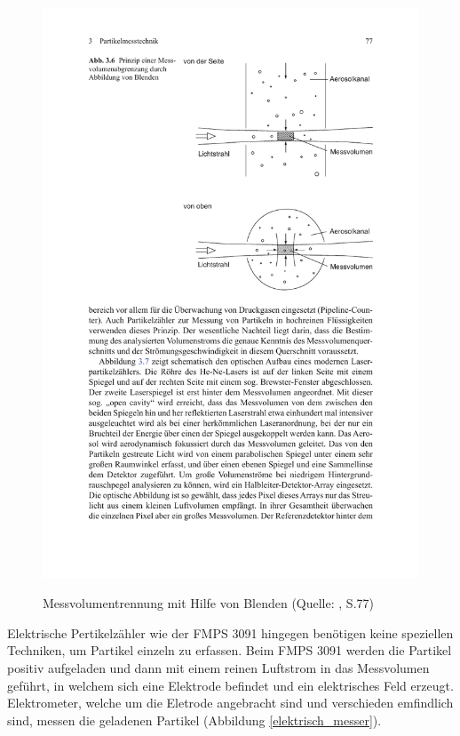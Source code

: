 \begin{figure}[H]
	\myfloatalign
	{\includegraphics[width=.9\linewidth]{gfx/requirements/blenden_fokus.pdf}} \quad
	\caption[Messvolumentrennung mit Hilfe von Blenden (Quelle: \cite{reinraumtechnik}, S.77)]
	{Messvolumentrennung mit Hilfe von Blenden (Quelle: \cite{reinraumtechnik}, S.77)}
	\label{fig:optisch_trennung}
\end{figure}

Elektrische Pertikelz\"{a}hler wie der FMPS 3091 hingegen ben\"{o}tigen keine speziellen Techniken, um Partikel einzeln zu erfassen. Beim FMPS 3091 werden die Partikel positiv aufgeladen und dann mit einem reinen Luftstrom in das Messvolumen gef\"{u}hrt, in welchem sich eine Elektrode befindet und ein elektrisches Feld erzeugt. Elektrometer, welche um die Eletrode angebracht sind und verschieden emfindlich sind, messen die geladenen Partikel (Abbildung \ref{elektrisch_messer}).

